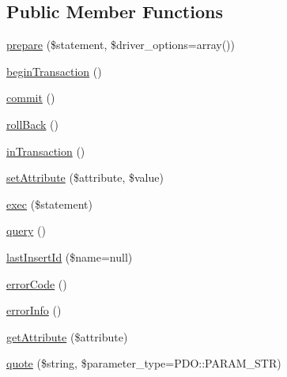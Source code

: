 \subsection*{Public Member Functions}
\begin{DoxyCompactItemize}
\item 
\mbox{\hyperlink{interface_pes_1_1_database_1_1_handler_1_1_mini_1_1_p_d_o_interface_af212c3950522906fe864096a27c24156}{prepare}} (\$statement, \$driver\+\_\+options=array())
\item 
\mbox{\hyperlink{interface_pes_1_1_database_1_1_handler_1_1_mini_1_1_p_d_o_interface_af3380f3b13931d581fa973a382946b32}{begin\+Transaction}} ()
\item 
\mbox{\hyperlink{interface_pes_1_1_database_1_1_handler_1_1_mini_1_1_p_d_o_interface_af5674c27d4a92f6228565010eacbb9cb}{commit}} ()
\item 
\mbox{\hyperlink{interface_pes_1_1_database_1_1_handler_1_1_mini_1_1_p_d_o_interface_aebaea4cae21e0e75ec1489c1648caeb3}{roll\+Back}} ()
\item 
\mbox{\hyperlink{interface_pes_1_1_database_1_1_handler_1_1_mini_1_1_p_d_o_interface_aaf34a959f7c26d1f97713adab5a6c429}{in\+Transaction}} ()
\item 
\mbox{\hyperlink{interface_pes_1_1_database_1_1_handler_1_1_mini_1_1_p_d_o_interface_aa4ddbee482d43ef83316a45744be018e}{set\+Attribute}} (\$attribute, \$value)
\item 
\mbox{\hyperlink{interface_pes_1_1_database_1_1_handler_1_1_mini_1_1_p_d_o_interface_aa14a8f8ef2c7ed2b8985d28b336941c9}{exec}} (\$statement)
\item 
\mbox{\hyperlink{interface_pes_1_1_database_1_1_handler_1_1_mini_1_1_p_d_o_interface_a8dbd35d765e8ff0d1c34461ef67c5abf}{query}} ()
\item 
\mbox{\hyperlink{interface_pes_1_1_database_1_1_handler_1_1_mini_1_1_p_d_o_interface_a9f9cb8ca720d7bbcb03869def521336e}{last\+Insert\+Id}} (\$name=null)
\item 
\mbox{\hyperlink{interface_pes_1_1_database_1_1_handler_1_1_mini_1_1_p_d_o_interface_a928a98b280c4dd8971ce6998eb157409}{error\+Code}} ()
\item 
\mbox{\hyperlink{interface_pes_1_1_database_1_1_handler_1_1_mini_1_1_p_d_o_interface_ac5230ce6cd46c5e922146a441d807877}{error\+Info}} ()
\item 
\mbox{\hyperlink{interface_pes_1_1_database_1_1_handler_1_1_mini_1_1_p_d_o_interface_ac8ff6f1aa68f8462ac6c3593c8071cc6}{get\+Attribute}} (\$attribute)
\item 
\mbox{\hyperlink{interface_pes_1_1_database_1_1_handler_1_1_mini_1_1_p_d_o_interface_a974d5921d0480c64f94c09994b8c0b48}{quote}} (\$string, \$parameter\+\_\+type=P\+D\+O\+::\+P\+A\+R\+A\+M\+\_\+\+S\+TR)
\end{DoxyCompactItemize}
